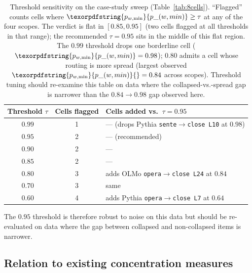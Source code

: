 \documentclass[11pt,letterpaper]{article}
\newcommand{\pwmin}{\texorpdfstring{\ensuremath{p_{w,\min}}}{p\_(w,min)}}
\begin{document}
\begin{table}[h]
  \centering
  \small
  \begin{tabular}{cc l}
    \toprule
    Threshold $\tau$ & Cells flagged & Cells added vs.\ $\tau = 0.95$\\
    \midrule
    $0.99$ & 1 & --- (drops Pythia \texttt{sente$\to$close L10} at $0.98$)\\
    $0.95$ & 2 & --- (recommended)\\
    $0.90$ & 2 & ---\\
    $0.85$ & 2 & ---\\
    $0.80$ & 3 & adds OLMo \texttt{opera$\to$close L24} at $0.84$\\
    $0.70$ & 3 & same\\
    $0.60$ & 4 & adds Pythia \texttt{opera$\to$close L7} at $0.64$\\
    \bottomrule
  \end{tabular}
  \caption{Threshold sensitivity on the case-study sweep
  (Table~\ref{tab:8cells}). ``Flagged'' counts cells where
  $\pwmin \geq \tau$ at any of the four scopes. The verdict is flat
  in $[0.85, 0.95]$ (two cells flagged at all thresholds in that
  range); the recommended $\tau = 0.95$ sits in the middle of this
  flat region. The $0.99$ threshold drops one borderline cell
  ($\pwmin = 0.98$); $0.80$ admits a cell whose routing is more
  spread (largest observed $\pwmin{} = 0.84$ across scopes).
  Threshold tuning should
  re-examine this table on data where the collapsed-vs.-spread gap
  is narrower than the $0.84 \to 0.98$ gap observed here.}
  \label{tab:sensitivity}
\end{table}

The $0.95$ threshold is therefore robust to noise on this data but
should be re-evaluated on data where the gap between collapsed and
non-collapsed items is narrower.

\subsection{Relation to existing concentration measures}
\end{document}
